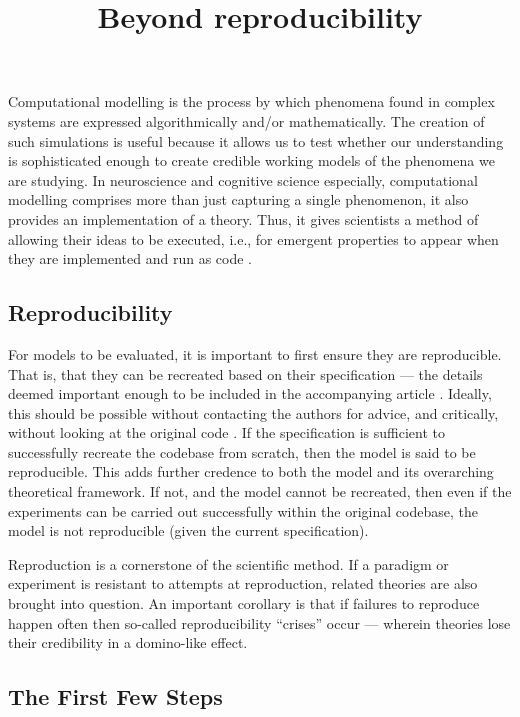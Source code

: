 \documentclass[jou]{apa6}
\title{Beyond reproducibility}
\begin{document}
\maketitle

Computational modelling is the process by which phenomena found in complex
systems are expressed algorithmically and/or mathematically.
The creation of such simulations is useful because it allows us to
test whether our understanding is sophisticated enough to create credible
working models of the phenomena we are studying.
In neuroscience and cognitive science especially, computational modelling comprises more than just capturing a single phenomenon, it also provides an implementation of a theory.
Thus, it gives scientists a method of allowing their ideas to be executed, i.e., for emergent properties to appear when they are implemented and run as code \cite{mcclelland09}.

\subsection*{Reproducibility}

For models to be evaluated, it is important to first ensure they are reproducible. 
That is, that they can be recreated based on their specification --- the details deemed important enough to be included in the accompanying article \cite{hinsen15}.
Ideally, this should be possible without contacting the authors for advice, and critically, without looking at the original code \cite{cooper14}.
If the specification is sufficient to successfully recreate the codebase from scratch, then the model is said to be reproducible.
This adds further credence to both the model and its overarching theoretical
framework.
If not, and the model cannot be recreated, then even if the experiments can be carried out successfully within the original codebase, the model is not reproducible (given the current specification).

Reproduction is a cornerstone of the scientific method.
If a paradigm or experiment is resistant to attempts at reproduction, related
theories are also brought into question.
An important corollary is that if failures to reproduce happen often then so-called reproducibility ``crises'' occur --- wherein theories lose their credibility in a domino-like effect.


\subsection*{The First Few Steps}
\end{document}
